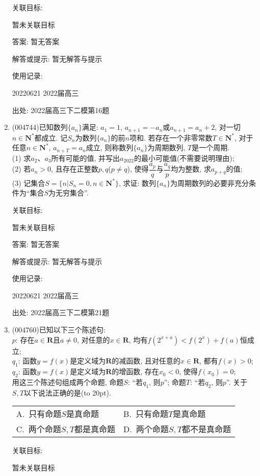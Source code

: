 \documentclass[10pt,a4paper]{article}
\newcommand{\bracket}[1]{(\hbox to #1pt{})}
\newcommand{\twoch}[4]{\par\begin{tabular}{p{.46\textwidth}p{.46\textwidth}}
A.~#1& B.~#2\\
C.~#3& D.~#4
\end{tabular}}
\begin{document}
\begin{enumerate}[1.]
关联目标:

暂未关联目标

答案: 暂无答案

解答或提示: 暂无解答与提示

使用记录:

20220621	2022届高三	


出处: 2022届高三下二模第16题
\item { (004744)}已知数列$\{a_n\}$满足: $a_1=1$, $a_{n+1}=-a_n$或$a_{n+1}=a_n+2$, 对一切$n\in \mathbf{N}^*$都成立. 记$S_n$为数列$\{a_n\}$的前$n$项和. 若存在一个非零常数$T\in \mathbf{N}^*$, 对于任意$n\in \mathbf{N}^*$, $a_{n+T}={a_n}$成立, 则称数列$\{a_n\}$为周期数列, $T$是一个周期.\\
(1) 求$a_2$、$a_3$所有可能的值, 并写出$a_{2022}$的最小可能值(不需要说明理由);\\
(2) 若$a_n>0$, 且存在正整数$p,q$($p\ne q$), 使得$\dfrac{a_p}q$与$\dfrac{a_q}p$均为整数, 求$a_{p+q}$的值;\\
(3) 记集合$S=\{n|S_n=0,n\in \mathbf{N}^*\}$, 求证: 数列$\{a_n\}$为周期数列的必要非充分条件为``集合$S$为无穷集合''.


关联目标:

暂未关联目标

答案: 暂无答案

解答或提示: 暂无解答与提示

使用记录:

20220621	2022届高三			


出处: 2022届高三下二模第21题
\item { (004760)}已知以下三个陈述句:\\
$p$: 存在$a\in \mathbf{R}$且$a\ne 0$, 对任意的$x\in \mathbf{R}$, 均有$f(2^{x+a})<f(2^x)+f(a)$恒成立;\\
$q_1$: 函数$y=f(x)$是定义域为$\mathbf{R}$的减函数, 且对任意的$x\in \mathbf{R}$, 都有$f(x)>0$;\\
$q_2$: 函数$y=f(x)$是定义域为$\mathbf{R}$的增函数, 存在$x_0<0$, 使得$f(x_0)=0$;\\
用这三个陈述句组成两个命题, 命题$S$: ``若$q_1$, 则$p$''; 命题$T$: ``若$q_2$, 则$p$''. 关于$S,T$以下说法正确的是\bracket{20}.
\twoch{只有命题$S$是真命题}{只有命题$T$是真命题}{两个命题$S,T$都是真命题}{两个命题$S,T$都不是真命题}


关联目标:

暂未关联目标


\end{enumerate}
\end{document}
